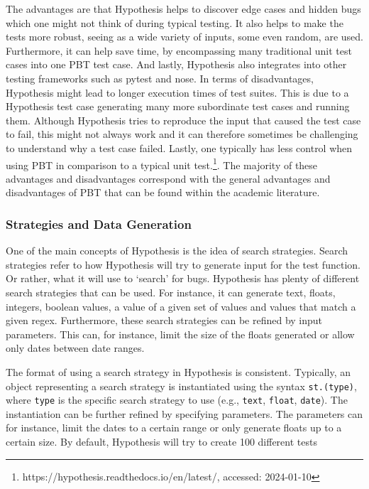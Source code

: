\documentclass[runningheads]{llncs}
\begin{document}
The advantages are that Hypothesis helps to discover edge cases and hidden bugs which one might not think of during typical testing. It also helps to make the tests more robust, seeing as a wide variety of inputs, some even random, are used.
Furthermore, it can help save time, by encompassing many traditional unit test cases into one PBT test case. And lastly, Hypothesis also integrates into other testing frameworks such as pytest and nose. In terms of disadvantages, Hypothesis might lead to longer execution times of test suites. This is due to a Hypothesis test case generating many more subordinate test cases and running them. Although Hypothesis tries to reproduce the input that caused the test case to fail, this might not always work and it can therefore sometimes be challenging to understand why a test case failed.
Lastly, one typically has less control when using PBT in comparison to a typical unit test.\footnote{https://hypothesis.readthedocs.io/en/latest/, accessed: 2024-01-10}. The majority of these advantages and disadvantages correspond with the general advantages and disadvantages of PBT that can be found within the academic literature.

\subsubsection{Strategies and Data Generation}
One of the main concepts of Hypothesis is the idea of search strategies. Search strategies refer to how Hypothesis will try to generate input for the test function. Or rather, what it will use to `search' for bugs. Hypothesis has plenty of different search strategies that can be used. For instance, it can generate text, floats, integers, boolean values, a value of a given set of values and values that match a given regex. Furthermore, these search strategies can be refined by input parameters. This can, for instance, limit the size of the floats generated or allow only dates between date ranges.

The format of using a search strategy in Hypothesis is consistent. Typically, an object representing a search strategy is instantiated using the syntax \texttt{st.(type)}, where \texttt{type} is the specific search strategy to use (e.g., \texttt{text}, \texttt{float}, \texttt{date}). The instantiation can be further refined by specifying parameters. The parameters can for instance, limit the dates to a certain range or only generate floats up to a certain size. By default, Hypothesis will try to create 100 different tests
\end{document}
